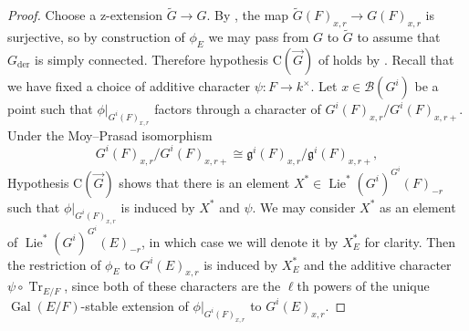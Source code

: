 \documentclass[reqno]{amsart}
\numberwithin{equation}{subsection}
\newcommand{\wt}[1]{\widetilde{#1}}
\newcommand{\Gal}{\operatorname{Gal}}
\newcommand{\co}{\colon}
\newcommand\cB{\mathcal{B}}
\newcommand\frg{\mathfrak{g}}
\DeclareMathOperator{\Tr}{Tr}
\DeclareMathOperator{\Hom}{Hom}
\DeclareMathOperator{\Lie}{Lie}
\DeclareMathOperator{\der}{der}
\newcommand{\rH}{\ensuremath{\mathrm{H}}\xspace}
\theoremstyle{remark}
\numberwithin{equation}{subsection}
\numberwithin{figure}{subsection}
\begin{document}
\begin{proof}
Choose a z-extension $\wt G \to G$. By \cite[Lemma 3.5.3]{Kal19}, the map $\wt G(F)_{x,r} \to G(F)_{x,r}$ is surjective, so by construction of $\phi_E$ we may pass from $G$ to $\wt G$ to assume that $G_{\der}$ is simply connected. Therefore hypothesis $\mathrm{C}(\vec G)$ of \cite[\S 2.6]{HM08} holds by \cite[Lemma 3.5.2]{Kal19}. Recall that we have fixed a choice of additive character $\psi\co F \to k^\times$. Let $x \in \cB(G^i)$ be a point such that $\phi|_{G^i(F)_{x,r}}$ factors through a character of $G^i(F)_{x,r}/G^i(F)_{x,r+}$. Under the Moy--Prasad isomorphism 
\[
G^i(F)_{x,r}/G^i(F)_{x,r+} \cong \frg^i(F)_{x,r}/\frg^i(F)_{x,r+},
\]
Hypothesis $\mathrm{C}(\vec G)$ shows that there is an element $X^* \in \Lie^*(G^i)^{G^i}(F)_{-r}$ such that $\phi|_{G^i(F)_{x,r}}$ is induced by $X^*$ and $\psi$. We may consider $X^*$ as an element of $\Lie^*(G^i)^{G^i}(E)_{-r}$, in which case we will denote it by $X^*_E$ for clarity. Then the restriction of $\phi_E$ to $G^i(E)_{x,r}$ is induced by $X^*_E$ and the additive character $\psi \circ \Tr_{E/F}$, since both of these characters are the $\ell$th powers of the unique $\Gal(E/F)$-stable extension of $\phi|_{G^i(F)_{x,r}}$ to $G^i(E)_{x,r}$.




\end{proof}
\end{document}
